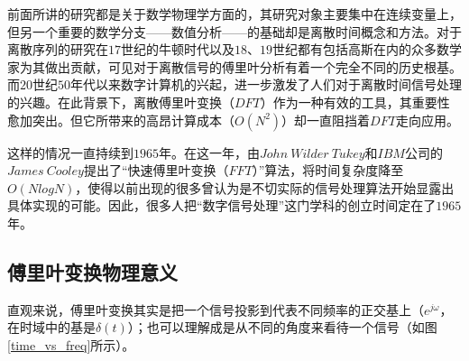 \documentclass[UTF8]{ctexart}
\begin{document}
            \indent 前面所讲的研究都是关于数学物理学方面的，其研究对象主要集中在连续变量上，但另一个重要的数学分支——数值分析——的基础却是离散时间概念和方法\cite{signal_and_system}。对于离散序列的研究在$17$世纪的牛顿时代以及$18$、$19$世纪都有包括高斯在内的众多数学家为其做出贡献，可见对于离散信号的傅里叶分析有着一个完全不同的历史根基\cite{signal_and_system}。而$20$世纪$50$年代以来数字计算机的兴起，进一步激发了人们对于离散时间信号处理的兴趣。在此背景下，离散傅里叶变换（$DFT$）作为一种有效的工具，其重要性愈加突出。但它所带来的高昂计算成本（$O(N^2)$）却一直阻挡着$DFT$走向应用。
            
            \indent 这样的情况一直持续到$1965$年。在这一年，由$John\ Wilder\ Tukey$和$IBM$公司的$James\ Cooley$提出了“快速傅里叶变换（$FFT$）”算法\cite{cooley1965algorithm}，将时间复杂度降至$O(NlogN)$，使得以前出现的很多曾认为是不切实际的信号处理算法开始显露出具体实现的可能\cite{discrete-time_signal_processing}。因此，很多人把“数字信号处理”这门学科的创立时间定在了$1965$年。

		\subsection{傅里叶变换物理意义}
			\indent 直观来说，傅里叶变换其实是把一个信号投影到代表不同频率的正交基上（$e^{j\omega}$，在时域中的基是$\delta(t)$）；也可以理解成是从不同的角度来看待一个信号（如图\ref{time_vs_freq}所示）。
			
\end{document}
